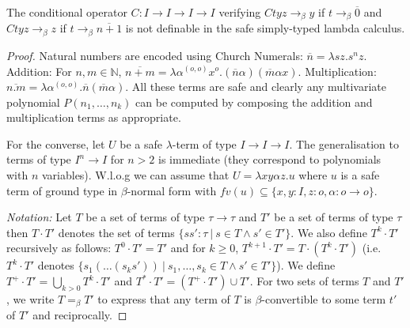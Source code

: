\documentclass{llncs}
\newcommand{\encode}[1]{\overline{#1}} \newcommand\dps{\displaystyle}
\newcommand\union{\cup}
\newcommand\Union{\bigcup}
\newcommand\nat{\mathbb{N}}
\begin{document}
\begin{corollary}
The conditional operator $C:I\rightarrow I\rightarrow I \rightarrow I$ verifying  $C t y z \rightarrow_\beta y$  if $t \rightarrow_\beta \encode{0}$ and $C t y z \rightarrow_\beta z$ if $t \rightarrow_\beta \encode{n+1}$ is not definable in the safe simply-typed lambda calculus.
\end{corollary}
\begin{proof}
  Natural numbers are encoded using Church Numerals: $\encode{n} =
  \lambda s z. s^n z$.  Addition: For $n,m \in \nat$, $\encode{n+m} =
  \lambda \alpha^{(o,o)} x^o . (\encode{n} \alpha) (\encode{m} \alpha
  x)$. Multiplication: $\encode{n . m} = \lambda \alpha^{(o,o)}
  . \encode{n} (\encode{m} \alpha)$.  All these terms are safe and
  clearly any multivariate polynomial $P(n_1, \ldots, n_k)$ can be
  computed by composing the addition and multiplication terms as
  appropriate.

For the converse, let $U$ be a safe $\lambda$-term of type
$I\rightarrow I\rightarrow I$.  The generalisation to terms of type
$I^n \rightarrow I$ for $n>2$ is immediate (they correspond to
polynomials with $n$ variables). W.l.o.g we can
assume that $U = \lambda x y \alpha z. u$ where $u$ is a safe term of
ground type in $\beta$-normal form with $fv(u) \subseteq \{ x, y : I,
z :o, \alpha : o\rightarrow o \}$.

\emph{Notation:} Let $T$ be a set of terms of type $\tau \rightarrow \tau$ and $T'$ be a set of terms of type $\tau$ then $T \cdot T'$ denotes the set of terms $\{ s s' : \tau \ | \ s \in T \wedge s' \in T' \}$. We also define
$T^k \cdot T'$ recursively as follows:  $T^0 \cdot T' = T'$ and
for $k\geq 0$, $T^{k+1} \cdot T' = T \cdot (T^k \cdot T')$ (i.e. $T^k \cdot T'$ denotes $\{ s_1( \ldots (s_k s'))  \ | \ s_1, \ldots, s_k \in T \wedge s' \in T' \}$). We define $T^+\cdot T' = \Union_{k > 0} T^k \cdot T'$ and
$T^*\cdot T' = (T^+\cdot T') \union T'$.
For two sets of terms $T$ and $T'$, we write $T =_\beta T'$ to express that any term of $T$ is $\beta$-convertible to some term $t'$ of $T'$ and reciprocally.


\end{proof}
\end{document}
